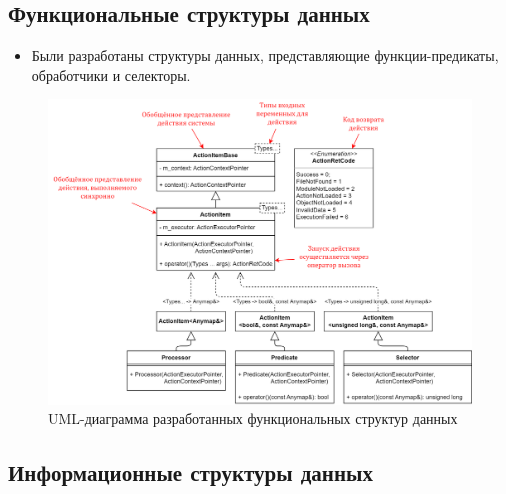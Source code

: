 ﻿%
\subsection{Функциональные структуры данных}
\begin{frame}
    \begin{itemize}
        \item Были разработаны структуры данных, представляющие функции-предикаты, обработчики и селекторы.
    \end{itemize}

    \begin{figure}
        \smaller[1]
        \centering
        \includegraphics[height=0.67\textheight]{images/UML.graphFunctions.png}
        \caption{UML-диаграмма разработанных функциональных структур данных}
    \end{figure}

\end{frame}
\subsection{Информационные структуры данных}
\begin{frame}

\end{frame}
